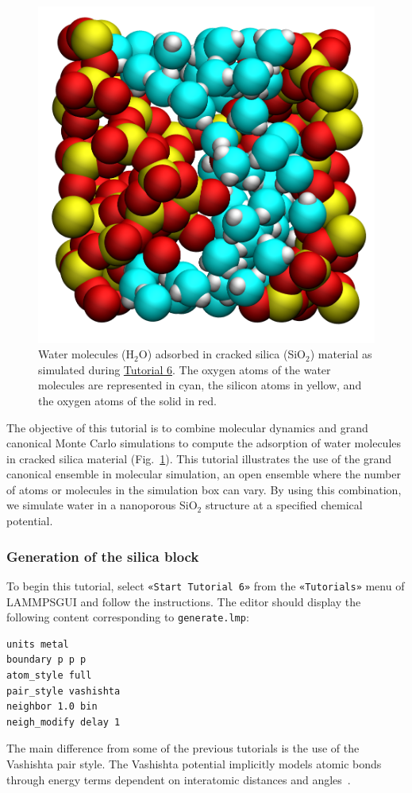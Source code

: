 \documentclass[9pt,tutorial]{livecoms}
\newcommand{\lmpcmd}[1]{\colorbox{listing}{\textcolor{command}{\small{#1}}}} %
\newcommand{\flecmd}[1]{\textcolor{command}{\texttt{#1}}} %
\newcommand{\guicmd}[1]{\textcolor{command}{\texttt{«#1»}}} %
\newcommand{\lammpsgui}{\textsf{LAMMPS\textendash GUI}}
\begin{document}
\begin{figure}
\centering
\includegraphics[width=0.6\linewidth]{GCMC}
\caption{Water molecules (H$_2$O) adsorbed in cracked silica (SiO$_2$) material as simulated
during \hyperref[gcmc-silica-label]{Tutorial 6}.  The oxygen atoms of the water
molecules are represented in cyan, the silicon atoms in yellow, and the oxygen
atoms of the solid in red.}
\label{fig:GCMC}
\end{figure}

The objective of this tutorial is to combine molecular dynamics and
grand canonical Monte Carlo simulations to compute the adsorption of water
molecules in cracked silica material (Fig.~\ref{fig:GCMC}).  This tutorial
illustrates the use of the grand canonical ensemble in molecular simulation, an
open ensemble where the number of atoms or molecules in the simulation box can vary.
By {\color{blue}using this combination, we simulate water in a nanoporous
SiO$_2$ structure at a specified chemical potential.}

\subsubsection{Generation of the silica block}

To begin this tutorial, select \guicmd{Start Tutorial 6} from the
\guicmd{Tutorials} menu of \lammpsgui{} and follow the instructions.
The editor should display the following content corresponding to \flecmd{generate.lmp}:
\begin{lstlisting}
units metal
boundary p p p
atom_style full
pair_style vashishta
neighbor 1.0 bin
neigh_modify delay 1
\end{lstlisting}
The main difference from some of the previous tutorials is the use of the \lmpcmd{Vashishta}
pair style.  The Vashishta potential implicitly models atomic bonds through
energy terms dependent on interatomic distances and angles~\cite{vashishta1990interaction}.
\end{document}
